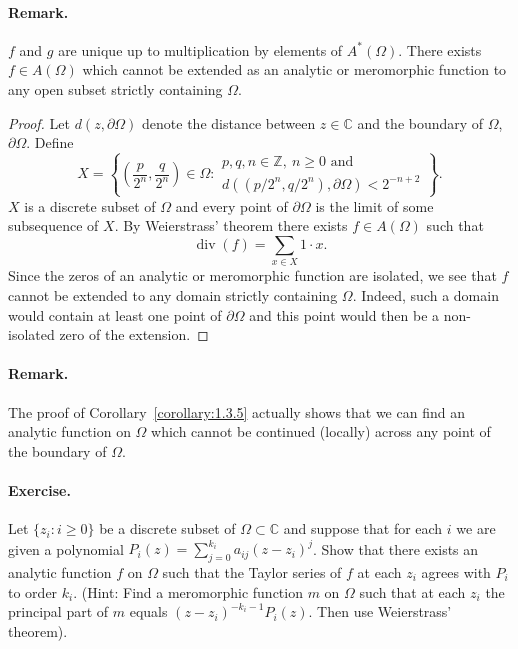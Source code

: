 \paragraph*{Remark.} $f$ and $g$ are unique up to multiplication by elements of $A^*(\Omega)$.
 There exists $f\in A(\Omega)$ which cannot be extended as an analytic or meromorphic function to any open subset strictly containing $\Omega$.
\begin{proof}
Let $d(z,\partial\Omega)$ denote the distance between $z\in\mathbb C$ and the boundary of $\Omega$, $\partial\Omega$. Define
\[
X=\left\{\left(\frac p{2^n},\frac q{2^n}\right)\in\Omega:
\begin{array}{l}p,q,n\in\mathbb Z,\ n\geq0\text{ and}\\ d((p/2^n,q/2^n),\partial\Omega)<2^{-n+2}\end{array}\right\}.
\]
$X$ is a discrete subset of $\Omega$ and every point of $\partial\Omega$ is the limit of some subsequence of $X$. By Weierstrass' theorem there exists $f\in A(\Omega)$ such that
\[ \operatorname{div}(f)=\sum_{x\in X}1\cdot x. \]
Since the zeros of an analytic or meromorphic function are isolated, we see that $f$ cannot be extended to any domain strictly containing $\Omega$. Indeed, such a domain would contain at least one point of $\partial\Omega$ and this point would then be a non-isolated zero of the extension.
\end{proof}
\paragraph*{Remark.} The proof of Corollary~\ref{corollary:1.3.5} actually shows that we can find an analytic function on $\Omega$ which cannot be continued (locally) across any point of the boundary of $\Omega$.
\paragraph*{Exercise.} Let $\{z_i:i\geq0\}$ be a discrete subset of $\Omega\subset\mathbb C$ and suppose that for each $i$ we are given a polynomial $P_i(z)=\sum_{j=0}^{k_i}a_{ij}(z-z_i)^j$. Show that there exists an analytic function $f$ on $\Omega$ such that the Taylor series of $f$ at each $z_i$ agrees with $P_i$ to order $k_i$. (Hint: Find a meromorphic function $m$ on $\Omega$ such that at each $z_i$ the principal part of $m$ equals $(z-z_i)^{-k_i-1}P_i(z)$. Then use Weierstrass' theorem).

